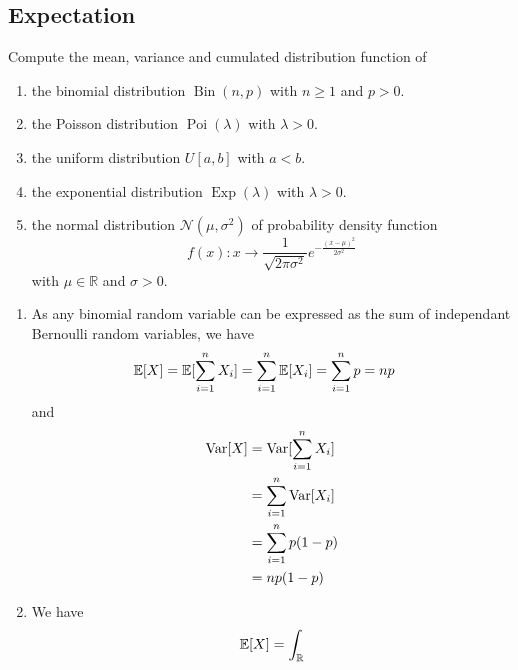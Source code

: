 \begin{center}
  \section*{Expectation}
\end{center}

\begin{Exercise}
  Compute the mean, variance and cumulated distribution function of
  \vspace*{0.2cm}

  \begin{enumerate}
    \item the binomial distribution $\operatorname{Bin}(n, p)$ with $n \geq 1$ and $p>0$.

    \item the Poisson distribution $\operatorname{Poi}(\lambda)$ with $\lambda>0$.

    \item the uniform distribution $U[a, b]$ with $a<b$.

    \item the exponential distribution $\operatorname{Exp}(\lambda)$ with $\lambda>0$.

    \item the normal distribution $\mathcal{N}\left(\mu, \sigma^{2}\right)$ of probability density function
          \[
            f(x) : x \to \frac{1}{\sqrt{2\pi \sigma^2}} e^{- \frac{{(x-\mu)}^2}{2 \sigma^2}}
          \]
          with $\mu \in \mathbb{R}$ and $\sigma>0$.

  \end{enumerate}
\end{Exercise}

\begin{solution}
  \begin{enumerate}
    \item As any binomial random variable can be expressed as the sum of independant Bernoulli random variables, we have
          \begin{align*}
            \mathbb{E}[X] & = \mathbb{E}[\sum_{i=1}^{n} X_i] = \sum_{i=1}^{n} \mathbb{E}[X_i] = \sum_{i=1}^{n} p = np
          \end{align*}
          and
          \begin{align*}
            \operatorname{Var}[X] & = \operatorname{Var}[\sum_{i=1}^{n} X_i] \\
                    & = \sum_{i=1}^{n} \operatorname{Var}[X_i] \\
                    & = \sum_{i=1}^{n} p(1-p)    \\
                    & = np(1-p)
          \end{align*}
    \item We have
          \begin{align*}
            \mathbb{E}[X] = \int_{\mathbb{R}}
          \end{align*}
  \end{enumerate}
\end{solution}

